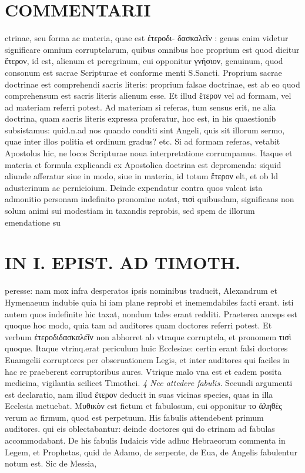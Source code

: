 \documentclass{article}
\begin{document}
\begin{pages}
\section*{COMMENTARII }
\marginpar{[ p.18 ]}\pstart ctrinae, seu forma ac materia, quae est έτεροδι- δασκαλεῖν : genus enim videtur significare omnium corruptelarum, quibus omnibus hoc proprium est quod dicitur ἕτερον, id est, alienum et peregrinum, cui opponitur γνήσιον, genuinum, quod consonum est sacrae Scripturae et conforme menti S.Sancti. Proprium sacrae doctrinae est comprehendi sacris literis: proprium falsae doctrinae, est ab eo quod comprehensum est sacris literis alienum esse. Et illud ἕτερον vel ad formam, vel ad materiam referri potest. Ad materiam si referas, tum sensus erit, ne alia doctrina, quam sacris literis expressa proferatur, hoc est, in his quaestionib subsistamus: quid.n.ad nos quando conditi sint Angeli, quis sit illorum sermo, quae inter illos politia et ordinum gradus? etc. Si ad formam referas, vetabit Apostolus hic, ne locos Scripturae noua interpretatione corrumpamus. Itaque et materia et formula explicandi ex Apostolica doctrina est depromenda: siquid aliunde afferatur siue in modo, siue in materia, id totum ἕτερον elt, et ob ld adusterinum ac pernicioium. Deinde expendatur contra quos valeat  \pend\pstart ista admonitio personam indefinito pronomine notat, τισὶ quibusdam, significans non solum animi sui modestiam in taxandis reprobis, sed spem de illorum emendatione su\pend
\section*{IN I. EPIST. AD TIMOTH. }
\marginpar{[ p.19 ]}\pstart peresse: nam mox infra desperatos ipsis nominibus traducit, Alexandrum et Hymenaeum indubie quia hi iam plane reprobi et inememdabiles facti erant. isti autem quos indefinite hic taxat, nondum tales erant redditi. Praeterea anceps est quoque hoc modo, quia tam ad auditores quam doctores referri potest. Et verbum ἐτεροδιδασκαλέῖν non abhorret ab vtraque corruptela, et pronomem τισὶ quoque. Itaque vtrinq.erat periculum huic Ecclesiae: certin erant falsi doctores Euamgelii corruptores per obseruationem Legis, et inter auditores qui faciles in hac re praeberent corruptoribus aures. Vtrique malo vna est et eadem posita medicina, vigilantia scilicet Timothei.  \pend
\textit{4 Nec attedere fabulis. }\pstart Secundi argumenti est declaratio, nam illud ἕτερον deducit in suas vicinas species, quas in illa Ecclesia metuebat. Μυθικὸν est fictum et fabulosum, cui opponitur το ἀληθὲς verum ac firmum, quod est perpetuum. His fabulis attendebent primum auditores. qui eis oblectabantur: deinde doctores qui do ctrinam ad fabulas accommodabant. De his fabulis Iudaicis vide adhuc Hebraeorum commenta in Legem, et Prophetas, quid de Adamo, de serpente, de Eua, de Angelis fabulentur notum est. Sic de Messia,  \pend

\end{pages}
\end{document}
